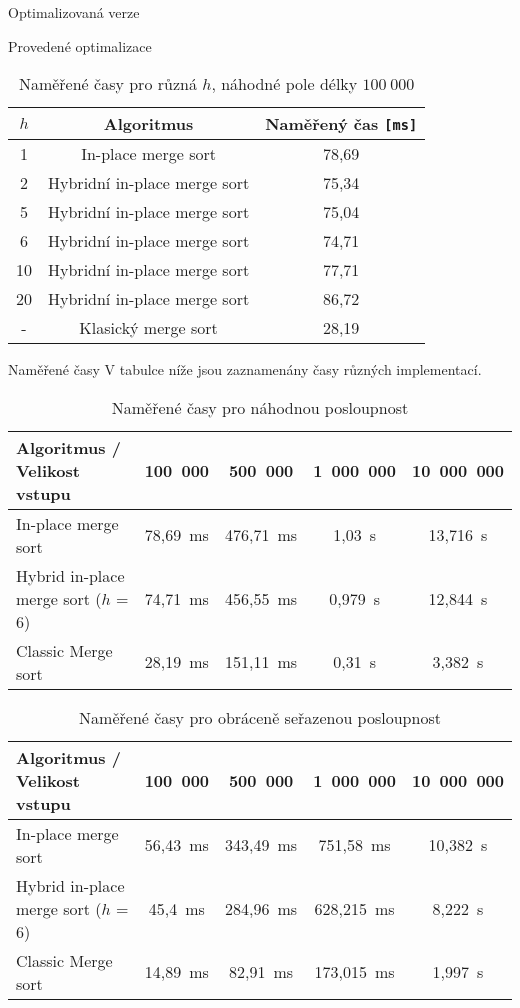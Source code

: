 \documentclass[a4paper,11pt]{article}
\begin{document}
\begin{section}{Optimalizovaná verze}
\begin{subsection}{Provedené optimalizace}
\begin{table}[ht]\centering
\begin{tabular}{|c|c|c|}
\hline
$h$ & Algoritmus & Naměřený čas \texttt{[ms]}\\ \hline
\hline
1 & In-place merge sort & 78,69\\
2 & Hybridní in-place merge sort & 75,34\\
5 & Hybridní in-place merge sort & 75,04\\
6 & Hybridní in-place merge sort & 74,71\\
10 & Hybridní in-place merge sort & 77,71\\
20 & Hybridní in-place merge sort & 86,72\\
- & Klasický merge sort & 28,19\\
\hline
\end{tabular}
\caption{Naměřené časy pro různá $h$, náhodné pole délky $100~000$}
\label{table:four}
\end{table}
\end{subsection}

\begin{subsection}{Naměřené časy}
V tabulce níže jsou zaznamenány časy různých implementací.

\begin{table}[h]\centering
\begin{tabular}{|l|c|c|c|c|}
\hline
Algoritmus / Velikost vstupu & 100~000 & 500~000 & 1~000~000 & 10~000~000\\
\hline\hline
In-place merge sort & 78,69~ms & 476,71~ms & 1,03~s & 13,716~s\\
Hybrid in-place merge sort ($h$ = 6) & 74,71~ms & 456,55~ms & 0,979~s & 12,844~s\\
Classic Merge sort & 28,19~ms & 151,11~ms & 0,31~s & 3,382~s\\
\hline

\end{tabular}
\caption{Naměřené časy pro náhodnou posloupnost}
\label{table:five}
\end{table}


\begin{table}[h]\centering
\begin{tabular}{|l|c|c|c|c|}
\hline
Algoritmus / Velikost vstupu & 100~000 & 500~000 & 1~000~000 & 10~000~000\\
\hline\hline
In-place merge sort & 56,43~ms & 343,49~ms & 751,58~ms & 10,382~s\\
Hybrid in-place merge sort ($h$ = 6) & 45,4~ms & 284,96~ms & 628,215~ms & 8,222~s\\
Classic Merge sort & 14,89~ms & 82,91~ms & 173,015~ms & 1,997~s\\
\hline

\end{tabular}
\caption{Naměřené časy pro obráceně seřazenou posloupnost}
\label{table:six}
\end{table}




\end{subsection}
\end{section}
\end{document}
